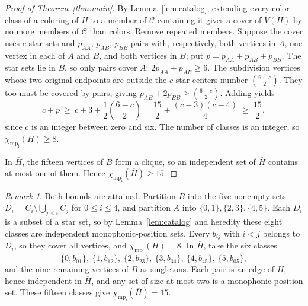 \documentclass[11pt]{article}
\theoremstyle{remark}
\newtheorem*{remark}{Remark}
\newcommand{\chimp}{\chi_{\mathrm{mp}_{\mathrm{i}}}}
\begin{document}
\begin{proof}[Proof of Theorem~\ref{thm:main}]
By Lemma~\ref{lem:catalog}, extending every color class of a coloring of
$H$ to a member of $\mathcal C$ containing it gives a cover of $V(H)$ by
no more members of $\mathcal C$ than colors. Remove repeated members.
Suppose the cover uses $c$ star sets and $p_{AA}$, $p_{AB}$, $p_{BB}$
pairs with, respectively, both vertices in $A$, one vertex in each of
$A$ and $B$, and both vertices in $B$; put $p=p_{AA}+p_{AB}+p_{BB}$. The
star sets lie in $B$, so only pairs cover $A$: $2p_{AA}+p_{AB}\geq6$. The
subdivision vertices whose two original endpoints are outside the $c$
star centers number $\binom{6-c}{2}$. They too must be covered by pairs,
giving $p_{AB}+2p_{BB}\geq\binom{6-c}{2}$. Adding yields
\[
 c+p\ \geq\ c+3+\frac12\binom{6-c}{2}
 =\frac{15}{2}+\frac{(c-3)(c-4)}4\ \geq\ \frac{15}{2},
\]
since $c$ is an integer between zero and six. The number of classes is
an integer, so $\chimp(H)\geq8$.

In $\overline H$, the fifteen vertices of $B$ form a clique, so an
independent set of $\overline H$ contains at most one of them. Hence
$\chimp(\overline H)\geq15$.
\end{proof}

\begin{remark}
Both bounds are attained. Partition $B$ into the five nonempty sets
$D_i=C_i\setminus\bigcup_{j<i}C_j$ for $0\leq i\leq4$, and partition $A$
into $\{0,1\},\{2,3\},\{4,5\}$. Each $D_i$ is a subset of a star set, so
by Lemma~\ref{lem:catalog} and heredity these eight classes are
independent monophonic-position sets. Every $b_{ij}$ with $i<j$ belongs
to $D_i$, so they cover all vertices, and $\chimp(H)=8$. In $\overline
H$, take the six classes
\[
 \{0,b_{01}\},\ \{1,b_{12}\},\ \{2,b_{23}\},\
 \{3,b_{34}\},\ \{4,b_{45}\},\ \{5,b_{05}\},
\]
and the nine remaining vertices of $B$ as singletons. Each pair is an
edge of $H$, hence independent in $\overline H$, and any set of size at
most two is a monophonic-position set. These fifteen classes give
$\chimp(\overline H)=15$.
\end{remark}
\end{document}
